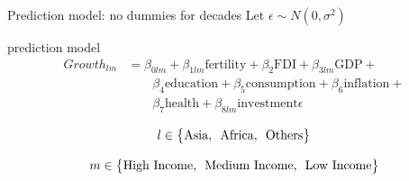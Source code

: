 \documentclass[9pt]{beamer}
\begin{document}
\begin{frame}{Prediction model: no dummies for decades}
	Let $ \epsilon \sim N(0,\sigma^2)$
	\begin{block}{prediction model}
		\begin{align*}
		Growth_{lm} &= \beta_{0lm}+\beta_{1lm}\text{fertility}+\beta_{2}\text{FDI}+\beta_{3lm}\text{GDP}+\\
		&\qquad
		\beta_{4}\text{education}+\beta_{5}\text{consumption}+\beta_{6}\text{inflation}+\\
		&\qquad \beta_{7}\text{health}+\beta_{8lm}\text{investment}\epsilon \end{align*}
	\end{block}
	\begin{block}{}
		
		\[
		l \in \big\{ \text{Asia},\enskip \text{Africa} ,\enskip \text{Others}    \big\}
		\]
		
		\[
		m \in \big\{ \text{High Income}, \enskip \text{Medium Income}, \enskip \text{Low Income}\big\}
		\]
	\end{block}
	
\end{frame}
\end{document}
